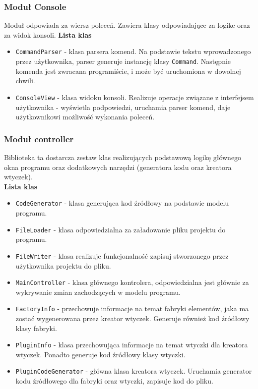 \documentclass[12pt]{article}
\begin{document}
\subsubsection{Moduł Console}
Moduł odpowiada za wiersz poleceń. Zawiera klasy odpowiadające za logike oraz za widok konsoli. 
\cleardoublepage
\textbf{Lista klas}
\begin{itemize}
  \setlength{\itemsep}{0em}
\item \texttt{CommandParser} - klasa parsera komend. Na podstawie tekstu wprowadzonego przez użytkownika, parser generuje instancję klasy \texttt{Command}. Następnie komenda jest zwracana programiście, i może być uruchomiona w dowolnej chwili.
\item \texttt{ConsoleView} - klasa widoku konsoli. Realizuje operacje związane z interfejsem użytkownika - wyświetla podpowiedzi, uruchamia parser komend, daje użytkownikowi możliwość wykonania poleceń.
\end{itemize}
\subsubsection{Moduł controller}
Biblioteka ta dostarcza zestaw klas realizujących podstawową logikę głównego okna programu oraz dodatkowych narzędzi (generatora kodu oraz kreatora wtyczek). \\ 
\textbf{Lista klas}
\begin{itemize}
  \setlength{\itemsep}{0em}
\item \texttt{CodeGenerator} - klasa generująca kod źródłowy na podstawie modelu programu.
\item \texttt{FileLoader} - klasa odpowiedzialna za załadowanie pliku projektu do programu.
\item \texttt{FileWriter} - klasa realizuje funkcjonalność zapisuj stworzonego przez użytkownika projektu do pliku.
\item \texttt{MainController} - klasa głównego kontrolera, odpowiedzialna jest głównie za wykrywanie zmian zachodzących w modelu programu.
\item \texttt{FactoryInfo} - przechowuje informacje na temat fabryki elementów, jaka ma zostać wygenerowana przez kreator wtyczek. Generuje również kod źródłowy klasy fabryki.
\item \texttt{PluginInfo} - klasa przechowująca informacje na temat wtyczki dla kreatora wtyczek. Ponadto generuje kod źródłowy klasy wtyczki.
\item \texttt{PluginCodeGenerator} - główna klasa kreatora wtyczek. Uruchamia generator kodu źródłowego dla fabryki oraz wtyczki, zapisuje kod do pliku.
\end{itemize}
\end{document}
